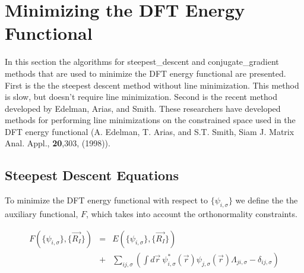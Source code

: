 \section{Minimizing the DFT Energy Functional}
\label{sec:pspw_Minimize}

In this section the algorithms for steepest\_descent and conjugate\_gradient 
methods that are used to minimize the DFT energy functional are presented.
First is the the steepest descent method without line minimization.   
This method is slow, but doesn't require line minimization.  
Second is the recent method developed by Edelman, Arias, and Smith.
These researchers have developed methods for performing line minimizations
on the constrained space used in the DFT energy functional
(A. Edelman, T. Arias, and S.T. Smith, Siam J. Matrix Anal. Appl., 
\textbf{20},303, (1998)).


\subsection{Steepest Descent Equations}
\label{sec:pspw_sd2}

To minimize the DFT energy functional with respect to $\{\psi_{i,\sigma}\}$
we define the the auxiliary functional, $F$, which takes into account
the orthonormality constraints.

\begin{eqnarray}
F\left(\{\psi_{i,\sigma}\},\{\vec{R_I}\} \right)
&=& E\left(\{\psi_{i,\sigma}\},\{\vec{R_I}\} \right) \nonumber \\
&+&\sum_{ij,\sigma}  \left( \int d\vec{r}\ 
\psi_{i,\sigma}^{*}(\vec{r}) \psi_{j,\sigma}(\vec{r}) \Lambda_{ji,\sigma}
                 - \delta_{ij,\sigma} 
\right) 
\label{eq:sd1}
\end{eqnarray}

